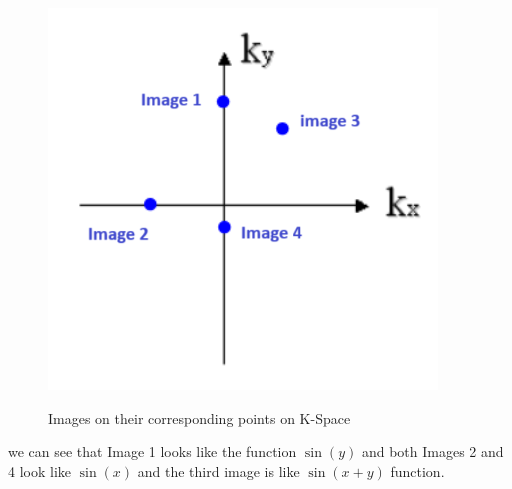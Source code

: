 \documentclass[11pt]{article}
\begin{document}
\begin{figure}[H]
\begin{center}
    \includegraphics[scale=0.8]{Fig/2.2kspace.axis.png}
    \label{fig:kspaceAxis}
    \caption{Images on their corresponding points on K-Space}
\end{center}
\end{figure}
we can see that Image 1 looks like the function $\sin(y)$ and both Images 2 and 4 look like $\sin(x)$
and the third image is like $\sin(x+y)$ function.
\end{document}
